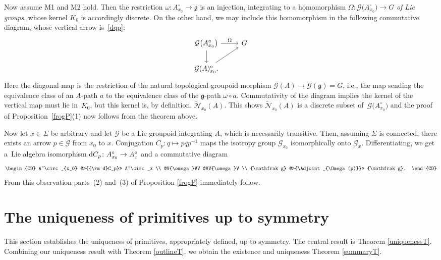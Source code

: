 Now assume M1 and M2 hold. Then the restriction $\omega \colon
A^\circ_{x_0} \rightarrow {\mathfrak g} $ is an injection, integrating
to a homomorphism $\Omega \colon {\mathcal G}\big(A^\circ_{x_0}\big)
\rightarrow G$ {\em of Lie groups}, whose kernel $K_0$ is accordingly
discrete. On the other hand, we may include this homomorphism in the
following commutative diagram, whose vertical arrow is~\eqref{dqp}:
\begin{equation*}
 \begin{tikzcd} {\mathcal G}\big(A^\circ_{x_0}\big) \arrow{d}{}
\arrow{r}{\Omega} & G \\ {\mathcal G}(A)^\circ_{x_0}.
\arrow[swap]{ru}{} &
 \end{tikzcd}
\end{equation*} Here the diagonal map is the restriction of the natural
topological groupoid morphism ${\mathcal G}(A) \rightarrow {\mathcal
G}({\mathfrak g}) = G$, i.e., the map sending the equivalence class of
an $A$-path $a$ to the equivalence class of the ${\mathfrak g}$-path
$\omega \circ a$. Commutativity of the diagram implies the kernel of
the vertical map must lie in~$K_0$, but this kernel is, by definition,
$\tilde {\mathcal N}_{x_0}(A)$. This shows $\tilde {\mathcal
N}_{x_0}(A)$ is a discrete subset of~${\mathcal G}\big(A^\circ_{x_0}\big)$ and
the proof of Proposition~\ref{frogP}(1) now follows from the
theorem above.

Now let $x \in \Sigma $ be arbitrary and let ${\mathcal G} $ be a Lie
groupoid integrating $A$, which is necessarily transitive. Then,
assuming $\Sigma $ is connected, there exists an arrow $p \in
{\mathcal G} $ from $x_0$ to $x$. Conjugation $C_p\colon q \mapsto
pqp^{-1}$ maps the isotropy group ${\mathcal G}_{x_0}$ isomorphically
onto ${\mathcal G}_x$. Differentiating, we get a~Lie algebra
isomorphism ${\rm d}C_p \colon A^\circ_{x_0} \rightarrow A^\circ_x$ and a
commutative diagram
\begin{equation*}%
 \begin{CD} A^\circ_{x_0} @>{{\rm d}C_p}>> A^\circ_x \\ @V{\omega}VV
@VV{\omega}V \\ {\mathfrak g} @>{\Adjoint_{\Omega(p)}}>> {\mathfrak g}.
 \end{CD}
\end{equation*}
From this observation parts~(2) and~(3) of Proposition \ref{frogP} immediately follow.

\section{The uniqueness of primitives up to symmetry}\label{infch}
This section establishes the uniqueness of primitives, appropriately
defined, up to symmetry. The central result is Theorem
\ref{uniquenessT}. Combining our uniqueness result with Theorem
\ref{outlineT}, we obtain the existence and uniqueness Theorem
\ref{summaryT}.

